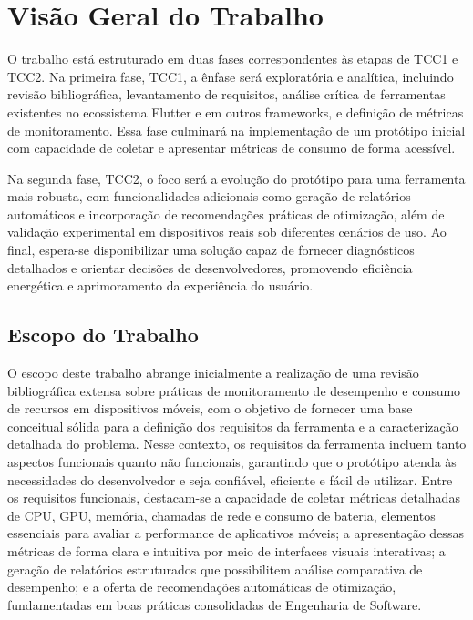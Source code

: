 \documentclass[12pt,a4paper]{article}
\begin{document}
\section{Visão Geral do Trabalho}
O trabalho está estruturado em duas fases correspondentes às etapas de TCC1 e TCC2. Na primeira fase, TCC1, a ênfase será exploratória e analítica, incluindo revisão bibliográfica, levantamento de requisitos, análise crítica de ferramentas existentes no ecossistema Flutter e em outros frameworks, e definição de métricas de monitoramento. Essa fase culminará na implementação de um protótipo inicial com capacidade de coletar e apresentar métricas de consumo de forma acessível.  

Na segunda fase, TCC2, o foco será a evolução do protótipo para uma ferramenta mais robusta, com funcionalidades adicionais como geração de relatórios automáticos e incorporação de recomendações práticas de otimização, além de validação experimental em dispositivos reais sob diferentes cenários de uso. Ao final, espera-se disponibilizar uma solução capaz de fornecer diagnósticos detalhados e orientar decisões de desenvolvedores, promovendo eficiência energética e aprimoramento da experiência do usuário.

\subsection{Escopo do Trabalho}
O escopo deste trabalho abrange inicialmente a realização de uma revisão bibliográfica extensa sobre práticas de monitoramento de desempenho e consumo de recursos em dispositivos móveis, com o objetivo de fornecer uma base conceitual sólida para a definição dos requisitos da ferramenta e a caracterização detalhada do problema. Nesse contexto, os requisitos da ferramenta incluem tanto aspectos funcionais quanto não funcionais, garantindo que o protótipo atenda às necessidades do desenvolvedor e seja confiável, eficiente e fácil de utilizar. Entre os requisitos funcionais, destacam-se a capacidade de coletar métricas detalhadas de CPU, GPU, memória, chamadas de rede e consumo de bateria, elementos essenciais para avaliar a performance de aplicativos móveis; a apresentação dessas métricas de forma clara e intuitiva por meio de interfaces visuais interativas; a geração de relatórios estruturados que possibilitem análise comparativa de desempenho; e a oferta de recomendações automáticas de otimização, fundamentadas em boas práticas consolidadas de Engenharia de Software.  
\end{document}
